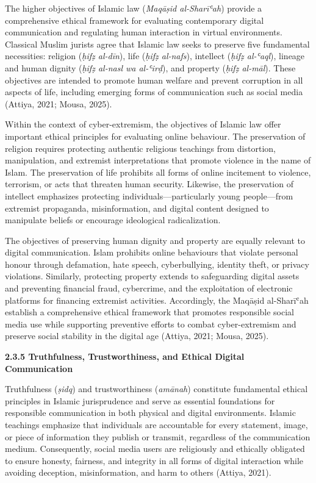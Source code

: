 \documentclass[11pt,a4paper]{article}
\begin{document}
	The higher objectives of Islamic law (\textit{Maqāṣid al-Sharīʿah}) provide a comprehensive ethical framework for evaluating contemporary digital communication and regulating human interaction in virtual environments. Classical Muslim jurists agree that Islamic law seeks to preserve five fundamental necessities: religion (\textit{ḥifẓ al-dīn}), life (\textit{ḥifẓ al-nafs}), intellect (\textit{ḥifẓ al-ʿaql}), lineage and human dignity (\textit{ḥifẓ al-nasl wa al-ʿirḍ}), and property (\textit{ḥifẓ al-māl}). These objectives are intended to promote human welfare and prevent corruption in all aspects of life, including emerging forms of communication such as social media (Attiya, 2021; Mousa, 2025).
	
	Within the context of cyber-extremism, the objectives of Islamic law offer important ethical principles for evaluating online behaviour. The preservation of religion requires protecting authentic religious teachings from distortion, manipulation, and extremist interpretations that promote violence in the name of Islam. The preservation of life prohibits all forms of online incitement to violence, terrorism, or acts that threaten human security. Likewise, the preservation of intellect emphasizes protecting individuals---particularly young people---from extremist propaganda, misinformation, and digital content designed to manipulate beliefs or encourage ideological radicalization.
	
	The objectives of preserving human dignity and property are equally relevant to digital communication. Islam prohibits online behaviours that violate personal honour through defamation, hate speech, cyberbullying, identity theft, or privacy violations. Similarly, protecting property extends to safeguarding digital assets and preventing financial fraud, cybercrime, and the exploitation of electronic platforms for financing extremist activities. Accordingly, the Maqāṣid al-Sharīʿah establish a comprehensive ethical framework that promotes responsible social media use while supporting preventive efforts to combat cyber-extremism and preserve social stability in the digital age (Attiya, 2021; Mousa, 2025).
	
	\textbf{2.3.5 Truthfulness, Trustworthiness, and Ethical Digital Communication}
	
	Truthfulness (\textit{ṣidq}) and trustworthiness (\textit{amānah}) constitute fundamental ethical principles in Islamic jurisprudence and serve as essential foundations for responsible communication in both physical and digital environments. Islamic teachings emphasize that individuals are accountable for every statement, image, or piece of information they publish or transmit, regardless of the communication medium. Consequently, social media users are religiously and ethically obligated to ensure honesty, fairness, and integrity in all forms of digital interaction while avoiding deception, misinformation, and harm to others (Attiya, 2021).
	
\end{document}
